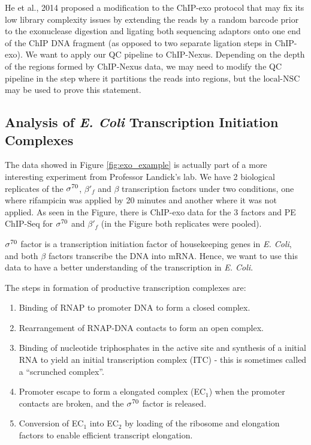 \documentclass[11pt]{article}\usepackage[]{graphicx}\usepackage[]{color}
\begin{document}
He et al., 2014 \cite{chipnexus} proposed a modification to the
ChIP-exo protocol that may fix its low library complexity issues by
extending the reads by a random barcode prior to the exonuclease
digestion and ligating both sequencing adaptors onto one end of the
ChIP DNA fragment (as opposed to two separate ligation steps in
ChIP-exo). We want to apply our QC pipeline to ChIP-Nexus. Depending
on the depth of the regions formed by ChIP-Nexus data, we may need to
modify the QC pipeline in the step where it partitions the reads into
regions, but the $\mbox{local-NSC}$ may be used to prove this
statement.

\subsection{Analysis of \emph{E. Coli} Transcription Initiation Complexes}
\label{sec:ecoli}

The data showed in Figure \ref{fig:exo_example} is actually part of a
more interesting experiment from Professor Landick's lab. We have 2
biological replicates of the $\sigma^{70}$, $\beta'_f$ and $\beta$
transcription factors under two conditions, one where rifampicin was
applied by 20 minutes and another where it was not applied. As seen in
the Figure, there is ChIP-exo data for the 3 factors and PE ChIP-Seq
for $\sigma^{70}$ and $\beta'_f$ (in the Figure both replicates were pooled).

$\sigma^{70}$ factor is a transcription initiation factor of housekeeping
genes in \emph{E. Coli}, and both $\beta$ factors transcribe the DNA into
mRNA. Hence, we want to use this data to have a better understanding
of the transcription in \emph{E. Coli}.

The steps in formation of productive transcription complexes are:

\begin{enumerate}
\item Binding of RNAP to promoter DNA to form a closed complex.
\item Rearrangement of RNAP-DNA contacts to form an open complex.
\item Binding of nucleotide triphosphates in the active site and
  synthesis of a initial RNA to yield an initial transcription complex
  (ITC) - this is sometimes called a ``scrunched complex''.
\item Promoter escape to form a elongated complex (EC$_1$) when the
  promoter contacts are broken, and the $\sigma^{70}$ factor is released.
\item Conversion of EC$_1$ into EC$_2$ by loading of the ribosome and
  elongation factors to enable efficient transcript elongation.
\end{enumerate}
\end{document}
